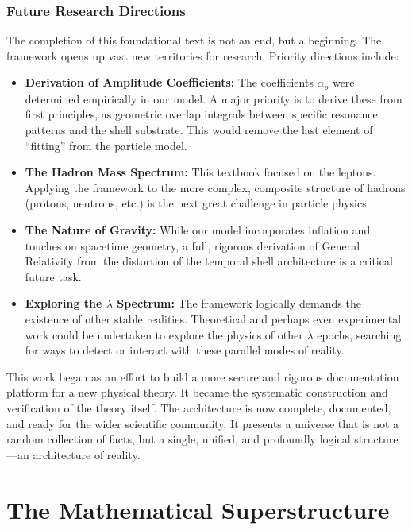 \documentclass[12pt]{report}
\begin{document}
\section{Future Research Directions}
The completion of this foundational text is not an end, but a beginning. The framework opens up vast new territories for research. Priority directions include:
\begin{itemize}
    \item \textbf{Derivation of Amplitude Coefficients:} The coefficients $\alpha_p$ were determined empirically in our model. A major priority is to derive these from first principles, as geometric overlap integrals between specific resonance patterns and the shell substrate. This would remove the last element of ``fitting'' from the particle model.
    \item \textbf{The Hadron Mass Spectrum:} This textbook focused on the leptons. Applying the framework to the more complex, composite structure of hadrons (protons, neutrons, etc.) is the next great challenge in particle physics.
    \item \textbf{The Nature of Gravity:} While our model incorporates inflation and touches on spacetime geometry, a full, rigorous derivation of General Relativity from the distortion of the temporal shell architecture is a critical future task.
    \item \textbf{Exploring the $\lambda$ Spectrum:} The framework logically demands the existence of other stable realities. Theoretical and perhaps even experimental work could be undertaken to explore the physics of other $\lambda$ epochs, searching for ways to detect or interact with these parallel modes of reality.
\end{itemize}

This work began as an effort to build a more secure and rigorous documentation platform for a new physical theory. It became the systematic construction and verification of the theory itself. The architecture is now complete, documented, and ready for the wider scientific community. It presents a universe that is not a random collection of facts, but a single, unified, and profoundly logical structure---an architecture of reality.

\part{The Mathematical Superstructure}

\end{document}
